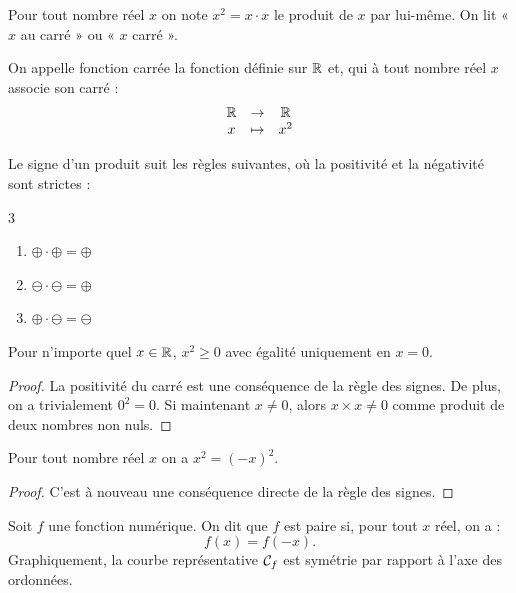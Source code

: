 \documentclass[a4paper, 12pt]{report}
\begin{document}
\begin{nota}
Pour tout nombre réel $x$ on note $x^2 = x \cdot x$ le produit de $x$ par lui-même.
	On lit « $x$ au carré » ou « $x$ carré ».
\end{nota}

\begin{defn}
On appelle fonction carrée la fonction définie sur $\mathbb{R}$ et, qui à tout nombre réel $x$ associe son carré :
\[ \begin{array}{c c c}
\mathbb{R} & \to & \mathbb{R} \\
x &\mapsto & x^2
\end{array} \]
\end{defn}

\begin{thm}
	Le signe d'un produit suit les règles suivantes, où la positivité et la négativité sont strictes :
	\begin{multicols}{3}
	\begin{enumerate}[label=(\roman*)]
		\item $\oplus \cdot \oplus = \oplus$
		\item $\ominus \cdot \ominus = \oplus$
		\item $\oplus \cdot\ominus = \ominus$
	\end{enumerate}
	\end{multicols}
\end{thm}

\begin{thm}
	Pour n'importe quel $x\in\mathbb{R}$, $x^2 \geq 0$ avec égalité uniquement en $x=0$.
\end{thm}

\begin{proof}
La positivité du carré est une conséquence de la règle des signes. 
De plus, on a trivialement $0^2 = 0$. Si maintenant $x \neq 0$, alors $x \times x \neq 0$ comme produit de deux nombres non nuls.
\end{proof}

\begin{prop}
Pour tout nombre réel $x$ on a $x^2 = (-x)^2$.
\end{prop}

\begin{proof}
C'est à nouveau une conséquence directe de la règle des signes.
\end{proof}

\begin{defn}
Soit $f$ une fonction numérique. On dit que $f$ est paire si, pour tout $x$ réel, on a :
\[ f(x) = f(-x) . \]
Graphiquement, la courbe représentative $\mathcal{C}_f$ est symétrie par rapport à l'axe des ordonnées.
\end{defn}
\end{document}
